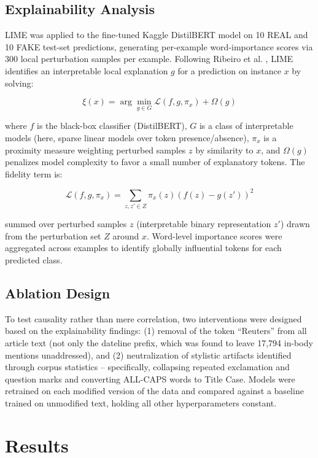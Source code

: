 \documentclass[conference]{IEEEtran}
\begin{document}
\subsection{Explainability Analysis}
LIME was applied to the fine-tuned Kaggle DistilBERT model on 10 REAL and 10 FAKE test-set predictions, generating per-example word-importance scores via 300 local perturbation samples per example. Following Ribeiro et al. \cite{ribeiro2016}, LIME identifies an interpretable local explanation $g$ for a prediction on instance $x$ by solving:

\begin{equation}
\xi(x) = \arg\min_{g \in G} \mathcal{L}(f, g, \pi_x) + \Omega(g)
\end{equation}

where $f$ is the black-box classifier (DistilBERT), $G$ is a class of interpretable models (here, sparse linear models over token presence/absence), $\pi_x$ is a proximity measure weighting perturbed samples $z$ by similarity to $x$, and $\Omega(g)$ penalizes model complexity to favor a small number of explanatory tokens. The fidelity term is:

\begin{equation}
\mathcal{L}(f, g, \pi_x) = \sum_{z, z' \in Z} \pi_x(z) \left(f(z) - g(z')\right)^2
\end{equation}

summed over perturbed samples $z$ (interpretable binary representation $z'$) drawn from the perturbation set $Z$ around $x$. Word-level importance scores were aggregated across examples to identify globally influential tokens for each predicted class.

\subsection{Ablation Design}
To test causality rather than mere correlation, two interventions were designed based on the explainability findings: (1) removal of the token ``Reuters'' from all article text (not only the dateline prefix, which was found to leave 17,794 in-body mentions unaddressed), and (2) neutralization of stylistic artifacts identified through corpus statistics -- specifically, collapsing repeated exclamation and question marks and converting ALL-CAPS words to Title Case. Models were retrained on each modified version of the data and compared against a baseline trained on unmodified text, holding all other hyperparameters constant.

\section{Results}
\end{document}
